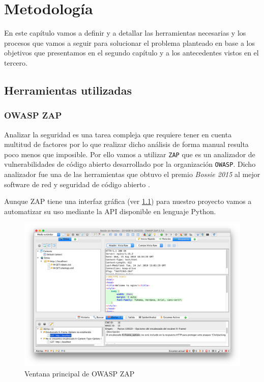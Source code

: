 \chapter{Metodología}

En este capítulo vamos a definir y a detallar las herramientas necesarias y los procesos que vamos a seguir para solucionar el problema planteado en base a los objetivos que presentamos en el segundo capítulo y a los antecedentes vistos en el tercero.

\section{Herramientas utilizadas}

\subsection{OWASP ZAP}

Analizar la seguridad es una tarea compleja que requiere tener en cuenta multitud de factores por lo que realizar dicho análisis de forma manual resulta poco menos que imposible. Por ello vamos a utilizar \texttt{ZAP} que es un analizador de vulnerabilidades de código abierto desarrollado por la organización \texttt{OWASP}. Dicho analizador fue una de las herramientas que obtuvo el premio \textit{Bossie 2015} al mejor software de red y seguridad de código abierto \cite{staff_bossie_2015}.

\bigskip
Aunque ZAP tiene una interfaz gráfica (ver \ref{fig:owasp_zap}) para nuestro proyecto vamos a automatizar su uso mediante la API disponible en lenguaje Python.


\begin{figure}[H]
\centering
\includegraphics[width=1.0\textwidth]{../images/owasp-zap-main-window}
\caption{Ventana principal de OWASP ZAP}
\label{fig:owasp_zap}
\end{figure}


